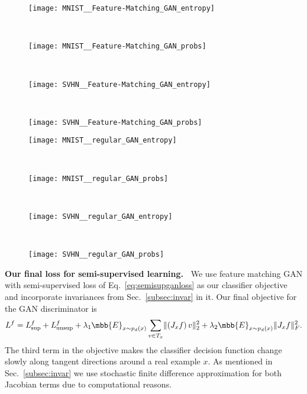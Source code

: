\documentclass{article}
\begin{document}
\begin{figure*}[t!]
    \centering
    \begin{subfigure}[t]{0.23\textwidth}
        \centering
        \texttt{[image: MNIST\_\_Feature-Matching\_GAN\_entropy]}
    \end{subfigure}%
    ~ 
    \begin{subfigure}[t]{0.23\textwidth}
        \centering
        \texttt{[image: MNIST\_\_Feature-Matching\_GAN\_probs]}
    \end{subfigure}%
    ~
    \begin{subfigure}[t]{0.23\textwidth}
        \centering
        \texttt{[image: SVHN\_\_Feature-Matching\_GAN\_entropy]}
    \end{subfigure}%
    ~ 
    \begin{subfigure}[t]{0.23\textwidth}
        \centering
        \texttt{[image: SVHN\_\_Feature-Matching\_GAN\_probs]}
    \end{subfigure}
    
    \begin{subfigure}[t]{0.23\textwidth}
        \centering
        \texttt{[image: MNIST\_\_regular\_GAN\_entropy]}
    \end{subfigure}%
    ~ 
    \begin{subfigure}[t]{0.23\textwidth}
        \centering
        \texttt{[image: MNIST\_\_regular\_GAN\_probs]}
    \end{subfigure}%
    ~
    \begin{subfigure}[t]{0.23\textwidth}
        \centering
        \texttt{[image: SVHN\_\_regular\_GAN\_entropy]}
    \end{subfigure}%
    ~ 
    \begin{subfigure}[t]{0.23\textwidth}
        \centering
        \texttt{[image: SVHN\_\_regular\_GAN\_probs]}
    \end{subfigure}
    
    \caption{Plots of Entropy, $L^f_\text{unsup}$ (Eq.~\eqref{eq:semisupganloss}), $a_i(x_g)$, $b_i(x)$ and other probabilities (Eq.~\eqref{eq:unsupgrad}) for regular GAN generator loss and feature-matching GAN generator loss.}
    \label{fig:analysis}
\end{figure*}{\bf Our final loss for semi-supervised learning.~} We use feature matching GAN with semi-supervised loss of Eq.~\eqref{eq:semisupganloss} as our classifier objective and incorporate  invariances from Sec.~\ref{subsec:invar} in it. Our final objective for the GAN discriminator is
\begin{align}
L^f = L^f_\text{sup} + L^f_\text{unsup} + \lambda_1 \mbb{E}_{x\sim p_d(x)} \sum_{v\in T_{x}}\lVert (J_{x} f) \, v\rVert_2^2 + \lambda_2 \mbb{E}_{x\sim p_d(x)} \lVert J_x f\rVert_F^2.
\label{eq:finalloss}
\end{align}
The third term in the objective makes the classifier decision function change slowly along tangent directions around a real example $x$. 
As mentioned in Sec.~\ref{subsec:invar} we use stochastic finite difference approximation for both Jacobian terms due to computational reasons.
\end{document}
